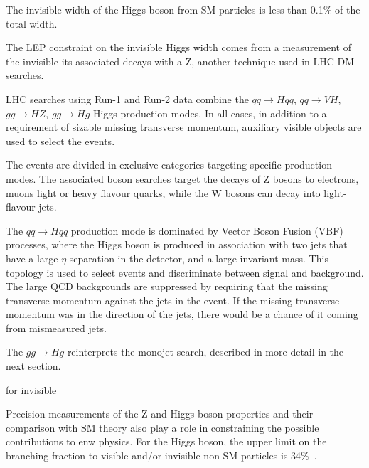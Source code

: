 
The invisible width of the Higgs boson from SM particles is less than 0.1\% of the total width. 

The LEP constraint on the invisible Higgs width comes from a measurement of the invisible its associated decays with a Z, another technique used in LHC DM searches. 

LHC searches using Run-1 and Run-2 data combine the $qq \rightarrow H qq$, $qq \rightarrow VH$, $gg \rightarrow HZ$, $gg \rightarrow Hg$ Higgs production modes. In all cases, in addition to a requirement of sizable missing transverse momentum, auxiliary visible objects are used to select the events. 

The events are divided in exclusive categories targeting specific production modes. The associated boson searches target the decays of Z bosons to electrons, muons light or heavy flavour quarks, while the W bosons can decay into light-flavour jets. 

The $qq \rightarrow H qq$ production mode is dominated by Vector Boson Fusion (VBF) processes, where the Higgs boson is produced in association with two jets that have a large $\eta$ separation in the detector, and a large invariant mass. This topology is used to select events and discriminate between signal and background. The large QCD backgrounds are suppressed by requiring that the missing transverse momentum against the jets in the event. If the missing transverse momentum was in the direction of the jets, there would be a chance of it coming from mismeasured jets. %

 
The $gg \rightarrow Hg$ reinterprets the monojet search, described in more detail in the next section. 


 for invisible 





Precision measurements of the Z and Higgs boson properties and their comparison with SM theory also play a role in constraining the possible contributions to enw physics. For the Higgs boson, the upper limit on the branching fraction to visible and/or invisible non-SM particles is 34\%~\cite{Khachatryan:2016vau}. 


